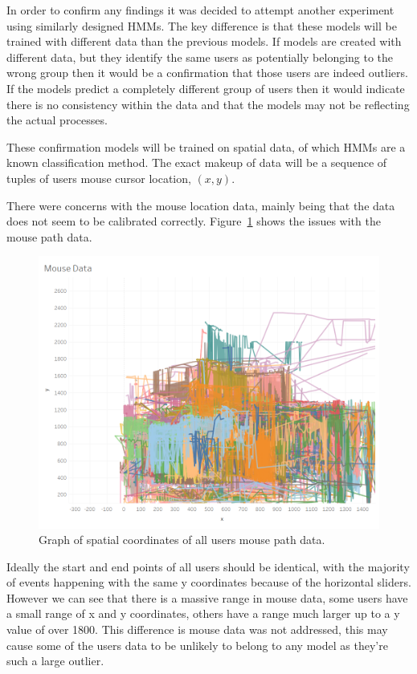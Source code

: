 \documentclass{article}
\begin{document}

In order to confirm any findings it was decided to attempt another experiment using similarly designed HMMs.
The key difference is that these models will be trained with different data than the previous models.
If models are created with different data, but they identify the same users as potentially belonging to the wrong group then it would be a confirmation that those users are indeed outliers.
If the models predict a completely different group of users then it would indicate there is no consistency within the data and that the models may not be reflecting the actual processes.  

These confirmation models will be trained on spatial data, of which HMMs are a known classification method. 
The exact makeup of data will be a sequence of tuples of users mouse cursor location, $(x, y)$.

There were concerns with the mouse location data, mainly being that the data does not seem to be calibrated correctly.
Figure~\ref{fig:MousePaths} shows the issues with the mouse path data.

\begin{figure}[ht!]
    \centering
    \includegraphics[scale=0.6]{Images/Mouse-Path-Data.png}
    \caption{Graph of spatial coordinates of all users mouse path data.}
    \label{fig:MousePaths}
\end{figure}

Ideally the start and end points of all users should be identical, with the majority of events happening with the same y coordinates because of the horizontal sliders. 
However we can see that there is a massive range in mouse data, some users have a small range of x and y coordinates, others have a range much larger up to a y value of over 1800.
This difference is mouse data was not addressed, this may cause some of the users data to be unlikely to belong to any model as they’re such a large outlier.
\end{document}
